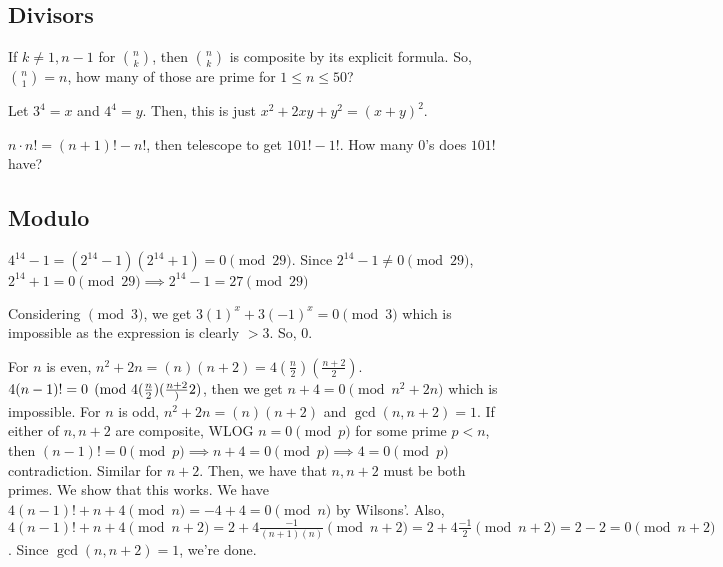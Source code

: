 \documentclass[11pt]{article}
\begin{document}
\subsection{Divisors}

\sol If $k\neq 1,n-1$ for $\binom{n}{k}$, then $\binom{n}{k}$ is composite by its explicit formula. So, $\binom{n}{1}=n$, how many of those are prime for $1\leq n\leq 50$? 



\sol Let $3^4=x$ and $4^4=y$. Then, this is just $x^2+2xy+y^2=(x+y)^2$.



\sol $n\cdot n! = (n+1)!-n!$, then telescope to get $101!-1!$. How many $0$'s does $101!$ have?

\subsection{Modulo}


\sol $4^{14}-1=(2^{14}-1)(2^{14}+1)=0\pmod{29}$. Since $2^{14}-1\neq 0 \pmod{29}$, $2^{14}+1=0\pmod{29}\implies 2^{14}-1=27\pmod{29}$


\sol Considering $\pmod{3}$, we get $3(1)^x+3(-1)^x=0\pmod{3}$ which is impossible as the expression is clearly $>3$. So, $\boxed{0}$.


\sol For $n$ is even, $n^2+2n=(n)(n+2)=4(\frac{n}{2})(\frac{n+2}{2})$. $4(n-1)!=0\pmod{4(\frac{n}{2})(\frac{n+2}}{2})$, then we get $n+4=0\pmod{n^2+2n}$ which is impossible. For $n$ is odd, $n^2+2n=(n)(n+2)$ and $\gcd(n,n+2)=1$. If either of $n, n+2$ are composite, WLOG $n=0\pmod{p}$ for some prime $p<n$, then $(n-1)!=0\pmod{p}\implies n+4=0\pmod{p}\implies 4 =0\pmod{p}$ contradiction. Similar for $n+2$. Then, we have that $n,n+2$ must be both primes. We show that this works. We have $4(n-1)!+n+4\pmod{n}=-4+4=0\pmod{n}$ by Wilsons'. Also, $4(n-1)!+n+4\pmod{n+2}=2+4\frac{-1}{(n+1)(n)}\pmod{n+2}=2+4\frac{-1}{2}\pmod{n+2}=2-2=0\pmod{n+2}$. Since $\gcd(n,n+2)=1$, we're done.
\end{document}
